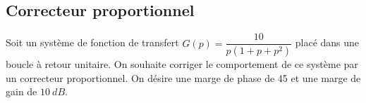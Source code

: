 %
%
%
%
%
%
%
%
%
%
%
%
%
\subsection*{Correcteur proportionnel}

\ifprof
\else
Soit un système de fonction de transfert $G(p)=\dfrac{10}{p\left(1+p+p^2\right)}$ placé dans une boucle à retour unitaire. On souhaite corriger le comportement de ce système par un correcteur proportionnel. On désire une marge de phase de \SI{45}{\degres} et une marge de gain de $\SI{10}{dB}$.

